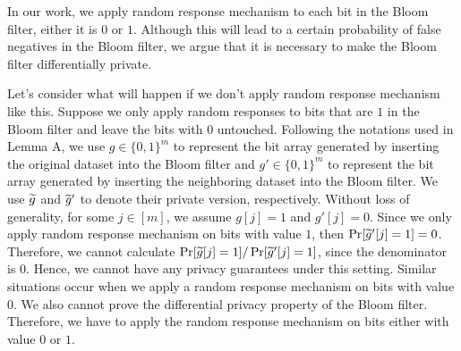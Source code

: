 In our work, we apply random response mechanism to each bit in the Bloom filter, either it is $0$ or $1$. Although this will lead to a certain probability of false negatives in the Bloom filter, we argue that it is necessary to make the Bloom filter differentially private.

Let's consider what will happen if we don't apply random response mechanism like this. Suppose we only apply random responses to bits that are $1$ in the Bloom filter and leave the bits with 0 untouched. 
Following the notations used in Lemma A, we use $g \in \{0, 1\}^m$ to represent the bit array generated by inserting the original dataset into the Bloom filter and $g' \in \{0, 1\}^m$ to represent the bit array generated by inserting the neighboring dataset into the Bloom filter. 
We use $\widetilde{g}$ and $\widetilde{g}'$ to denote their private version, respectively. 
Without loss of generality, for some $j \in [m]$, we assume $g[j] = 1$ and $g'[j] = 0$. 
Since we only apply random response mechanism on bits with value $1$, then $\Pr[\widetilde{g}' [j] = 1] = 0$. 
Therefore, we cannot calculate $\Pr[\widetilde{g} [j] = 1] / \Pr[\widetilde{g}' [j] = 1]$, since the denominator is $0$. 
Hence, we cannot have any privacy guarantees under this setting. 
Similar situations occur when we apply a random response mechanism on bits with value $0$. We also cannot prove the differential privacy property of the Bloom filter. 
Therefore, we have to apply the random response mechanism on bits either with value $0$ or $1$. 





